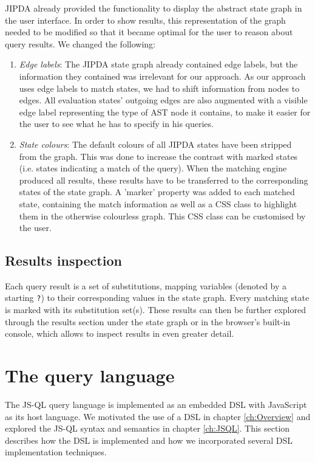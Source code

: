 JIPDA already provided the functionality to display the abstract state graph in the user interface. In order to show results, this representation of the graph needed to be modified so that it became optimal for the user to reason about query results. We changed the following:
\begin{enumerate}
\item \textit{Edge labels}: The JIPDA state graph already contained edge labels, but the information they contained was irrelevant for our approach. As our approach uses edge labels to match states, we had to shift information from nodes to edges. All evaluation states' outgoing edges are also augmented with a visible edge label representing the type of AST node it contains, to make it easier for the user to see what he has to specify in his queries.
\item \textit{State colours}: The default colours of all JIPDA states have been stripped from the graph. This was done to increase the contrast with marked states (i.e. states indicating a match of the query). When the matching engine produced all results, these results have to be transferred to the corresponding states of the state graph. A 'marker' property was added to each matched state, containing the match information as well as a CSS class to highlight them in the otherwise colourless graph. This CSS class can be customised by the user.
\end{enumerate}

\subsection*{Results inspection}

Each query result is a set of substitutions, mapping variables (denoted by a starting \texttt{?}) to their corresponding values in the state graph. Every matching state is marked with its substitution set(s). These results can then be further explored through the results section under the state graph or in the browser's built-in console, which allows to inspect results in even greater detail.


\section{The query language}
\label{sec:queryLanguageImpl}
The JS-QL query language is implemented as an embedded DSL with JavaScript as its host language. We motivated the use of a DSL in chapter \ref{ch:Overview} and explored the JS-QL syntax and semantics in chapter \ref{ch:JSQL}. This section describes how the DSL is implemented and how we incorporated several DSL implementation techniques.

